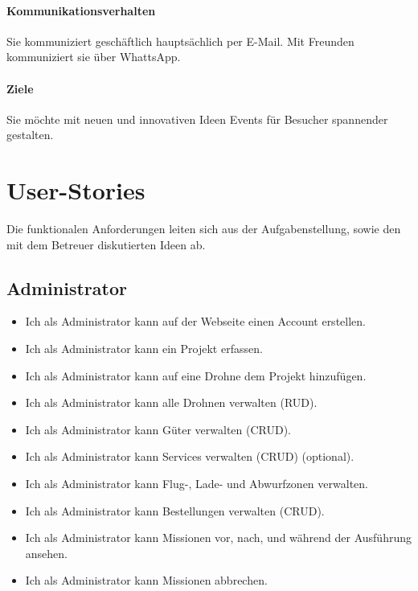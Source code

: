 \paragraph{Kommunikationsverhalten}
Sie kommuniziert geschäftlich hauptsächlich per E-Mail. Mit Freunden kommuniziert sie über WhattsApp.

\paragraph{Ziele} 
Sie möchte mit neuen und innovativen Ideen Events für Besucher spannender gestalten.

\section{User-Stories}

Die funktionalen Anforderungen leiten sich aus der Aufgabenstellung, sowie den mit dem Betreuer diskutierten Ideen ab. 

\subsection{Administrator}
\begin{itemize}
\item Ich als Administrator kann auf der Webseite einen Account erstellen.
\item Ich als Administrator kann ein Projekt erfassen.
\item Ich als Administrator kann auf eine Drohne dem Projekt hinzufügen.
\item Ich als Administrator kann alle Drohnen verwalten (RUD).
\item Ich als Administrator kann Güter verwalten (CRUD).
\item Ich als Administrator kann Services verwalten (CRUD) (optional).
\item Ich als Administrator kann Flug-, Lade- und Abwurfzonen verwalten.
\item Ich als Administrator kann Bestellungen verwalten (CRUD).
\item Ich als Administrator kann Missionen vor, nach, und während der Ausführung ansehen.
\item Ich als Administrator kann Missionen abbrechen.
\end{itemize}

